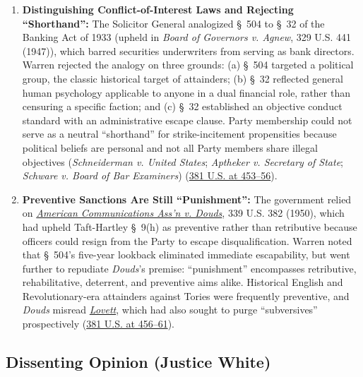 \documentclass[12pt]{article}
\begin{document}
\begin{enumerate}
  \item \textbf{Distinguishing Conflict-of-Interest Laws and Rejecting ``Shorthand'':} The Solicitor General analogized \S~504 to \S~32 of the Banking Act of 1933 (upheld in \textit{Board of Governors v. Agnew}, 329 U.S. 441 (1947)), which barred securities underwriters from serving as bank directors. Warren rejected the analogy on three grounds: (a) \S~504 targeted a political group, the classic historical target of attainders; (b) \S~32 reflected general human psychology applicable to anyone in a dual financial role, rather than censuring a specific faction; and (c) \S~32 established an objective conduct standard with an administrative escape clause. Party membership could not serve as a neutral ``shorthand'' for strike-incitement propensities because political beliefs are personal and not all Party members share illegal objectives (\textit{Schneiderman v. United States}; \textit{Aptheker v. Secretary of State}; \textit{Schware v. Board of Bar Examiners}) (\href{https://supreme.justia.com/cases/federal/us/381/437/}{381 U.S. at 453--56}).

  \item \textbf{Preventive Sanctions Are Still ``Punishment'':} The government relied on \href{https://supreme.justia.com/cases/federal/us/339/382/}{\textit{American Communications Ass'n v. Douds}}, 339 U.S. 382 (1950), which had upheld Taft-Hartley \S~9(h) as preventive rather than retributive because officers could resign from the Party to escape disqualification. Warren noted that \S~504's five-year lookback eliminated immediate escapability, but went further to repudiate \textit{Douds}'s premise: ``punishment'' encompasses retributive, rehabilitative, deterrent, and preventive aims alike. Historical English and Revolutionary-era attainders against Tories were frequently preventive, and \textit{Douds} misread \href{https://supreme.justia.com/cases/federal/us/328/303/}{\textit{Lovett}}, which had also sought to purge ``subversives'' prospectively (\href{https://supreme.justia.com/cases/federal/us/381/437/}{381 U.S. at 456--61}).
\end{enumerate}

\subsection{Dissenting Opinion (Justice White)}
\end{document}
